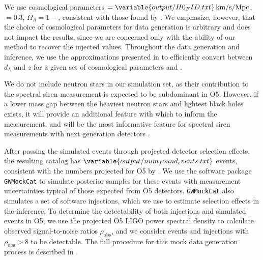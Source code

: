 \documentclass[preprint2,linenumbers]{aastex631}
\begin{document}
We use cosmological parameters \Ho$=\variable{output/H0_FID.txt}\Hunits$, \Omm$=0.3$, $\Omega_\Lambda=1-$\Omm, consistent with those found by \citet{planck_collaboration_planck_2016}.
We emphasize, however, that the choice of cosmological parameters for data generation is arbitrary and does not impact the results, since we are concerned only with the ability of our method to recover the injected values.
Throughout the data generation and inference, we use the approximations presented in \citet{adachi_analytical_2012} to efficiently convert between $d_L$ and $z$ for a given set of cosmological parameters \Omm{} and \Ho.

We do not include neutron stars in our simulation set, as their contribution to the spectral siren measurement is expected to be subdominant in \ac{O5}.
However, if a lower mass gap between the heaviest neutron stars and lightest black holes exists, it will provide an additional feature with which to inform the measurement, and will be the most informative feature for spectral siren measurements with next generation detectors \citep{ezquiaga_spectral_2022}.

After passing the simulated events through projected detector selection effects, the resulting catalog has $\variable{output/num_found_events.txt}$ events, consistent with the numbers projected for \ac{O5} by \citet{kiendrebeogo_updated_2023}.
We use the software package \texttt{GWMockCat} \citep{farah_things_2023} to simulate posterior samples for these events with measurement uncertainties typical of those expected from \ac{O5} detectors.
\texttt{GWMockCat} also simulates a set of software injections, which we use to estimate selection effects in the inference.
To determine the detectability of both injections and simulated events in O5, we use the projected \ac{O5} LIGO power spectral density \citep{obsscen_noise_curves,abbott_prospects_2020} to calculate observed signal-to-noise ratios $\rho_{\text{obs}}$, and we consider events and injections with $\rho_{\text{obs}}>8$ to be detectable. 
The full procedure for this mock data generation process is described in \citet{fishbach_where_2017, farah_things_2023, essick_ensuring_2024}.

\end{document}
